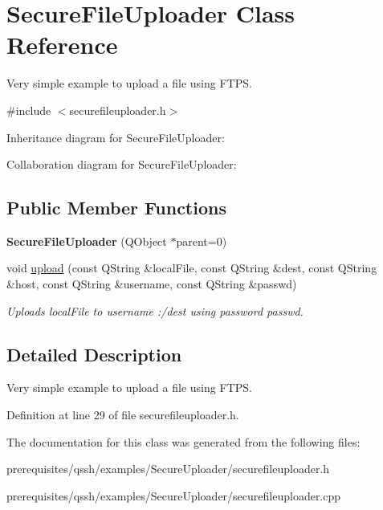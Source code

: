 \hypertarget{class_secure_file_uploader}{}\section{Secure\+File\+Uploader Class Reference}
\label{class_secure_file_uploader}


Very simple example to upload a file using F\+T\+PS.  




{\ttfamily \#include $<$securefileuploader.\+h$>$}



Inheritance diagram for Secure\+File\+Uploader\+:


Collaboration diagram for Secure\+File\+Uploader\+:
\subsection*{Public Member Functions}
\begin{DoxyCompactItemize}
\item 
\mbox{\label{class_secure_file_uploader_a8e40b31e49c465ae8fc86acd3187c2fa}} 
{\bfseries Secure\+File\+Uploader} (Q\+Object $\ast$parent=0)
\item 
\mbox{\label{class_secure_file_uploader_a4e8fb21c12fe20d8ef396e0b93519cfe}} 
void \mbox{\hyperlink{class_secure_file_uploader_a4e8fb21c12fe20d8ef396e0b93519cfe}{upload}} (const Q\+String \&local\+File, const Q\+String \&dest, const Q\+String \&host, const Q\+String \&username, const Q\+String \&passwd)
\begin{DoxyCompactList}\small\item\em Uploads {\itshape local\+File} to {\itshape username} \+:/dest using password {\itshape passwd}. \end{DoxyCompactList}\end{DoxyCompactItemize}


\subsection{Detailed Description}
Very simple example to upload a file using F\+T\+PS. 

Definition at line 29 of file securefileuploader.\+h.



The documentation for this class was generated from the following files\+:\begin{DoxyCompactItemize}
\item 
prerequisites/qssh/examples/\+Secure\+Uploader/securefileuploader.\+h\item 
prerequisites/qssh/examples/\+Secure\+Uploader/securefileuploader.\+cpp\end{DoxyCompactItemize}
